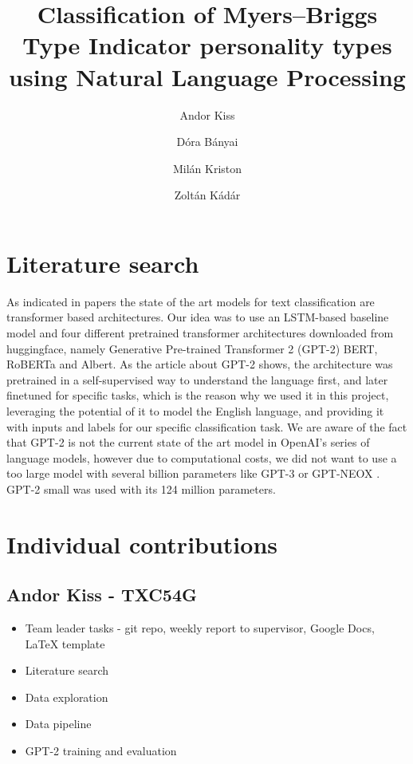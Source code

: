 \documentclass[runningheads]{llncs}
\begin{document}
%
\title{Classification of Myers–Briggs Type Indicator personality types using Natural Language Processing}
%
%
\author{Andor Kiss \and
Dóra Bányai \and
Milán Kriston \and
Zoltán Kádár}
%


\maketitle
\section{Literature search}

As indicated in papers \cite{DL_text_class} \cite{MBTI_class} the state of the art models for text classification are transformer based architectures. Our idea was to use an LSTM-based baseline model and four different pretrained transformer architectures downloaded from huggingface, namely Generative Pre-trained Transformer 2 (GPT-2) \cite{gpt2} BERT, RoBERTa and Albert. As the article about GPT-2 \cite{gpt2} shows, the architecture was pretrained in a self-supervised way to understand the language first, and later finetuned for specific tasks, which is the reason why we used it in this project, leveraging the potential of it to model the English language, and providing it with inputs and labels for our specific classification task. We are aware of the fact that GPT-2 is not the current state of the art model in OpenAI's series of language models, however due to computational costs, we did not want to use a too large model with several billion parameters like GPT-3 \cite{gpt-3} or GPT-NEOX \cite{gpt-neox}. GPT-2 small was used with its 124 million parameters.

\section{Individual contributions}

\subsection{Andor Kiss - TXC54G}

\begin{itemize}
  \item Team leader tasks - git repo, weekly report to supervisor, Google Docs, LaTeX template
  \item Literature search
  \item Data exploration
  \item Data pipeline
  \item GPT-2 training and evaluation
\end{itemize}
\end{document}
